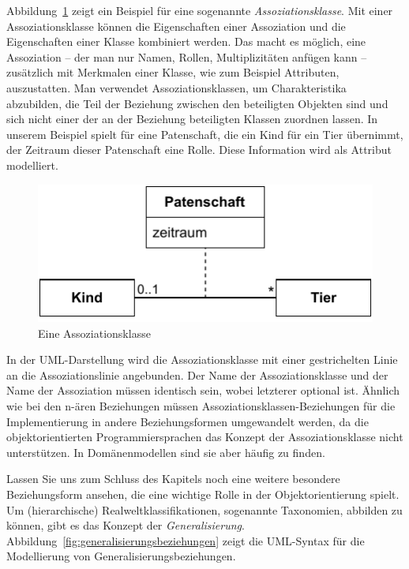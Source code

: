 Abbildung~\ref{fig:kind_patenschaft_tier} zeigt ein Beispiel für eine sogenannte \textit{Assoziationsklasse}. Mit einer Assoziationsklasse können die Eigenschaften einer Assoziation und die Eigenschaften einer Klasse kombiniert werden. Das macht es möglich, eine Assoziation -- der man nur Namen, Rollen, Multiplizitäten anfügen kann -- zusätzlich mit Merkmalen einer Klasse, wie zum Beispiel Attributen, auszustatten. Man verwendet Assoziations\-klassen, um Charakteristika abzubilden, die Teil der Beziehung zwischen den beteiligten Objekten sind und sich nicht einer der an der Beziehung beteiligten Klassen zuordnen lassen. In unserem Beispiel spielt für eine Patenschaft, die ein Kind für ein Tier übernimmt, der Zeitraum dieser Patenschaft eine Rolle. Diese Information wird als Attribut modelliert.

\begin{figure}[h!]
	\centering
	\includegraphics{Bilder/Kapitel-4/kind_patenschaft_tier.pdf}
	\caption{Eine Assoziationsklasse}
	\label{fig:kind_patenschaft_tier}
\end{figure}

In der UML-Darstellung wird die Assoziationsklasse mit einer gestrichelten Linie an die Assoziationslinie angebunden. Der Name der Assoziationsklasse und der Name der Assoziation müssen identisch sein, wobei letzterer optional ist. Ähnlich wie bei den n-ären Beziehungen müssen Assoziationsklassen-Beziehungen für die Implementierung in andere Beziehungsformen umgewandelt werden, da die objektorientierten Programmiersprachen das Konzept der Assoziationsklasse nicht unterstützen. In \mbox{Domänenmodellen} sind sie aber häufig zu finden.


Lassen Sie uns zum Schluss des Kapitels noch eine weitere besondere Beziehungsform ansehen, die eine wichtige Rolle in der Objektorientierung spielt. Um (hierarchische) Realweltklassifikationen, sogenannte Taxonomien, abbilden zu können, gibt es das Konzept der \textit{Generalisierung}. Abbildung~\ref{fig:generalisierungsbeziehungen} zeigt die UML-Syntax für die Modellierung von Generalisierungsbeziehungen.

